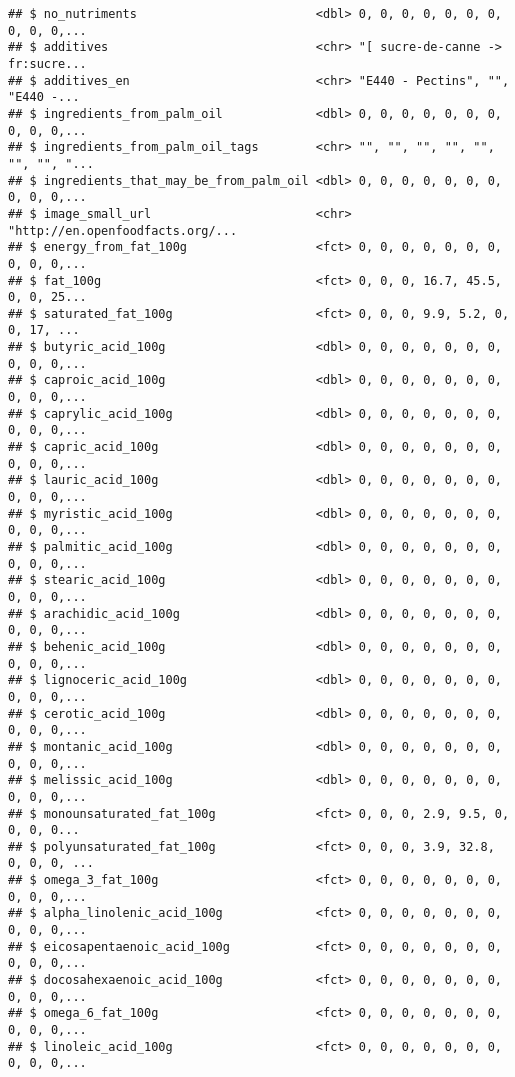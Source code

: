 \documentclass[]{article}
\begin{document}
\begin{verbatim}
## $ no_nutriments                         <dbl> 0, 0, 0, 0, 0, 0, 0, 0, 0, 0,...
## $ additives                             <chr> "[ sucre-de-canne -> fr:sucre...
## $ additives_en                          <chr> "E440 - Pectins", "", "E440 -...
## $ ingredients_from_palm_oil             <dbl> 0, 0, 0, 0, 0, 0, 0, 0, 0, 0,...
## $ ingredients_from_palm_oil_tags        <chr> "", "", "", "", "", "", "", "...
## $ ingredients_that_may_be_from_palm_oil <dbl> 0, 0, 0, 0, 0, 0, 0, 0, 0, 0,...
## $ image_small_url                       <chr> "http://en.openfoodfacts.org/...
## $ energy_from_fat_100g                  <fct> 0, 0, 0, 0, 0, 0, 0, 0, 0, 0,...
## $ fat_100g                              <fct> 0, 0, 0, 16.7, 45.5, 0, 0, 25...
## $ saturated_fat_100g                    <fct> 0, 0, 0, 9.9, 5.2, 0, 0, 17, ...
## $ butyric_acid_100g                     <dbl> 0, 0, 0, 0, 0, 0, 0, 0, 0, 0,...
## $ caproic_acid_100g                     <dbl> 0, 0, 0, 0, 0, 0, 0, 0, 0, 0,...
## $ caprylic_acid_100g                    <dbl> 0, 0, 0, 0, 0, 0, 0, 0, 0, 0,...
## $ capric_acid_100g                      <dbl> 0, 0, 0, 0, 0, 0, 0, 0, 0, 0,...
## $ lauric_acid_100g                      <dbl> 0, 0, 0, 0, 0, 0, 0, 0, 0, 0,...
## $ myristic_acid_100g                    <dbl> 0, 0, 0, 0, 0, 0, 0, 0, 0, 0,...
## $ palmitic_acid_100g                    <dbl> 0, 0, 0, 0, 0, 0, 0, 0, 0, 0,...
## $ stearic_acid_100g                     <dbl> 0, 0, 0, 0, 0, 0, 0, 0, 0, 0,...
## $ arachidic_acid_100g                   <dbl> 0, 0, 0, 0, 0, 0, 0, 0, 0, 0,...
## $ behenic_acid_100g                     <dbl> 0, 0, 0, 0, 0, 0, 0, 0, 0, 0,...
## $ lignoceric_acid_100g                  <dbl> 0, 0, 0, 0, 0, 0, 0, 0, 0, 0,...
## $ cerotic_acid_100g                     <dbl> 0, 0, 0, 0, 0, 0, 0, 0, 0, 0,...
## $ montanic_acid_100g                    <dbl> 0, 0, 0, 0, 0, 0, 0, 0, 0, 0,...
## $ melissic_acid_100g                    <dbl> 0, 0, 0, 0, 0, 0, 0, 0, 0, 0,...
## $ monounsaturated_fat_100g              <fct> 0, 0, 0, 2.9, 9.5, 0, 0, 0, 0...
## $ polyunsaturated_fat_100g              <fct> 0, 0, 0, 3.9, 32.8, 0, 0, 0, ...
## $ omega_3_fat_100g                      <fct> 0, 0, 0, 0, 0, 0, 0, 0, 0, 0,...
## $ alpha_linolenic_acid_100g             <fct> 0, 0, 0, 0, 0, 0, 0, 0, 0, 0,...
## $ eicosapentaenoic_acid_100g            <fct> 0, 0, 0, 0, 0, 0, 0, 0, 0, 0,...
## $ docosahexaenoic_acid_100g             <fct> 0, 0, 0, 0, 0, 0, 0, 0, 0, 0,...
## $ omega_6_fat_100g                      <fct> 0, 0, 0, 0, 0, 0, 0, 0, 0, 0,...
## $ linoleic_acid_100g                    <fct> 0, 0, 0, 0, 0, 0, 0, 0, 0, 0,...

\end{verbatim}
\end{document}
